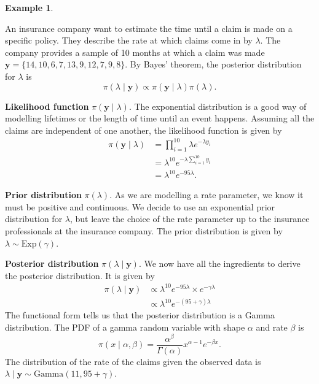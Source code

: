 \documentclass[
]{book}
\theoremstyle{definition}
\theoremstyle{definition}
\newtheorem{example}{Example}[chapter]
\theoremstyle{definition}
\theoremstyle{definition}
\theoremstyle{remark}
\begin{document}
\begin{example}
\protect\hypertarget{exm:exponential}{}\label{exm:exponential}

An insurance company want to estimate the time until a claim is made on a specific policy. They describe the rate at which claims come in by \(\lambda\). The company provides a sample of 10 months at which a claim was made \(\boldsymbol{y} = \{14, 10, 6, 7, 13, 9, 12, 7, 9, 8\}\). By Bayes' theorem, the posterior distribution for \(\lambda\) is
\[
\pi(\lambda \mid \boldsymbol{y}) \propto \pi(\boldsymbol{y} \mid \lambda) \pi(\lambda).
\]

\textbf{Likelihood function} \(\pi(\boldsymbol{y} \mid \lambda)\). The exponential distribution is a good way of modelling lifetimes or the length of time until an event happens. Assuming all the claims are independent of one another, the likelihood function is given by
\begin{align*}
\pi(\boldsymbol{y} \mid \lambda) &= \prod_{i=1}^{10} \lambda e^{-\lambda y_i} \\
& = \lambda^{10}e^{-\lambda \sum_{i=1}^{10} y_i} \\
& = \lambda^{10} e^{-95\lambda}.
\end{align*}

\textbf{Prior distribution} \(\pi(\lambda)\). As we are modelling a rate parameter, we know it must be positive and continuous. We decide to use an exponential prior distribution for \(\lambda\), but leave the choice of the rate parameter up to the insurance professionals at the insurance company. The prior distribution is given by \(\lambda \sim \textrm{Exp}(\gamma).\)

\textbf{Posterior distribution} \(\pi(\lambda \mid \boldsymbol{y})\). We now have all the ingredients to derive the posterior distribution. It is given by
\begin{align*}
\pi(\lambda \mid \boldsymbol{y}) &\propto \lambda^{10} e^{-95\lambda} \times e^{-\gamma\lambda} \\
& \propto \lambda^{10}e^{-(95 + \gamma)\lambda}
\end{align*}
The functional form tells us that the posterior distribution is a Gamma distribution. The PDF of a gamma random variable with shape \(\alpha\) and rate \(\beta\) is
\[
\pi(x \mid \alpha, \beta) = \frac{\alpha^\beta}{\Gamma(\alpha)}x^{\alpha-1}e^{-\beta x}.
\]
The distribution of the rate of the claims given the observed data is \(\lambda \mid \boldsymbol{y} \sim \textrm{Gamma}(11, 95 + \gamma)\).


\end{example}
\end{document}
